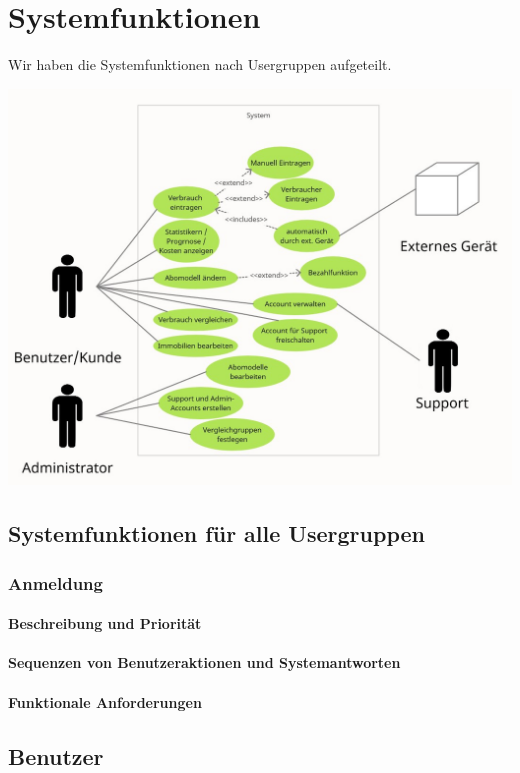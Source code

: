\section{Systemfunktionen}
\label{system_features}

Wir haben die Systemfunktionen nach Usergruppen aufgeteilt. 

\includegraphics[scale=0.5]{UC.jpg}

\subsection{Systemfunktionen für alle Usergruppen}
\subsubsection{Anmeldung}
\paragraph{Beschreibung und Priorität}
\paragraph{Sequenzen von Benutzeraktionen und Systemantworten}
\paragraph{Funktionale Anforderungen}

\subsection{Benutzer}
